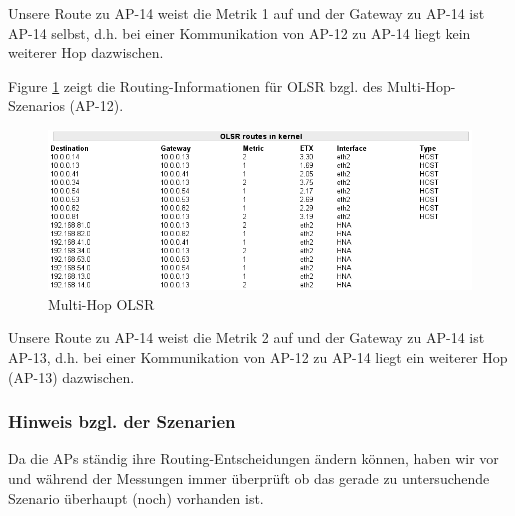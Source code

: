 \documentclass[a4paper,10pt]{article}
\begin{document}
Unsere Route zu AP-14 weist die Metrik 1 auf und der Gateway zu AP-14 ist AP-14 selbst, d.h. bei einer Kommunikation von AP-12 zu AP-14 liegt kein weiterer Hop dazwischen.

Figure \ref{2hop_olsr} zeigt die Routing-Informationen für OLSR bzgl. des Multi-Hop-Szenarios (AP-12).

\begin{center}
  \begin{figure}[thb]
    \includegraphics[width=1\textwidth]{2hop_olsr.png}
    \caption{Multi-Hop OLSR}
    \label{2hop_olsr}
  \end{figure}
\end{center}

Unsere Route zu AP-14 weist die Metrik 2 auf und der Gateway zu AP-14 ist AP-13, d.h. bei einer Kommunikation von AP-12 zu AP-14 liegt ein weiterer Hop (AP-13) dazwischen.

\subsubsection*{Hinweis bzgl. der Szenarien}

Da die APs ständig ihre Routing-Entscheidungen ändern können,
haben wir vor und während der Messungen immer überprüft ob das gerade zu untersuchende Szenario überhaupt (noch) vorhanden ist.

%
%
%
%
%
%
%
%
\end{document}
